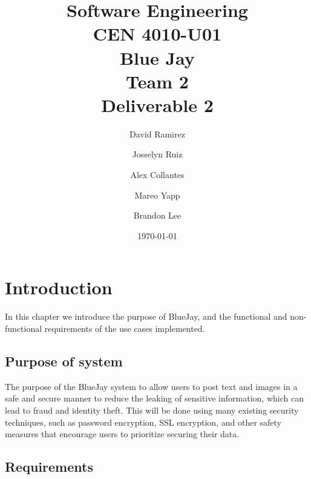 \documentclass{report}
\begin{document}
\title{Software Engineering\\CEN 4010-U01\\Blue Jay\\Team 2\\Deliverable 2}
\author{David Ramirez\and Josselyn Ruiz\and Alex Collantes\and Mareo Yapp\and Brandon Lee}
\date{\today}
\maketitle

\begin{abstract}

\end{abstract}

\chapter{Introduction}
In this chapter we introduce the purpose of BlueJay, and the functional and non-functional requirements of the use cases implemented.

\section{Purpose of system}
The purpose of the BlueJay system to allow users to post text and images in a safe and secure manner to reduce the leaking of sensitive information, which can lead to fraud and identity theft. This will be done using many existing security techniques, such as password encryption, SSL encryption, and other safety measures that encourage users to prioritize securing their data.
\section{Requirements}
\end{document}

